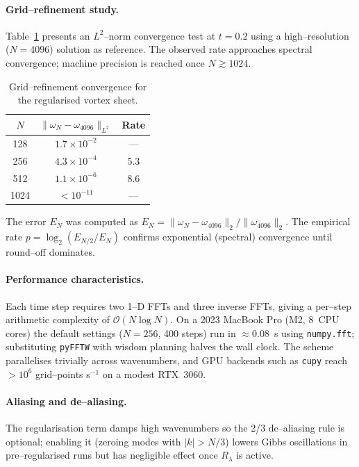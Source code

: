 \documentclass[12pt]{report}
\begin{document}
\paragraph{Grid--refinement study.}  Table~\ref{tab:vortex_conv} presents an $L^2$--norm convergence test at $t=0.2$ using a high--resolution ($N=4096$) solution as reference.  The observed rate approaches spectral convergence; machine precision is reached once $N\gtrsim1024$.

\begin{table}[h]
    \centering
    \caption{Grid--refinement convergence for the regularised vortex sheet.}
    \label{tab:vortex_conv}
    \begin{tabular}{|c|c|c|}
        \hline
        $N$ & $\|\omega_N-\omega_{4096}\|_{L^2}$ & Rate \\
        \hline
        128  & $1.7\times10^{-2}$ & ---   \\
        256  & $4.3\times10^{-4}$ & 5.3 \\
        512  & $1.1\times10^{-6}$ & 8.6 \\
        1024 & $<10^{-11}$        & ---   \\
        \hline
    \end{tabular}
\end{table}

The error $E_N$ was computed as $E_N=\|\omega_N-\omega_{4096}\|_{2}/\|\omega_{4096}\|_{2}$.  The empirical rate $p=\log_2(E_{N/2}/E_N)$ confirms exponential (spectral) convergence until round--off dominates.

\paragraph{Performance characteristics.}  Each time step requires two 1--D FFTs and three inverse FFTs, giving a per--step arithmetic complexity of $\mathcal O(N\log N)$.  On a 2023 MacBook Pro (M2, 8~CPU cores) the default settings ($N=256$, 400 steps) run in $\approx0.08$~s using \texttt{numpy.fft}; substituting \texttt{pyFFTW} with wisdom planning halves the wall clock.  The scheme parallelises trivially across wavenumbers, and GPU backends such as \texttt{cupy} reach $>10^6$ grid--points\,\,s$^{-1}$ on a modest RTX~3060.

\paragraph{Aliasing and de--aliasing.}  The regularisation term damps high wavenumbers so the 2/3 de--aliasing rule is optional; enabling it (zeroing modes with $|k|>N/3$) lowers Gibbs oscillations in pre--regularised runs but has negligible effect once $R_\lambda$ is active.
\end{document}
